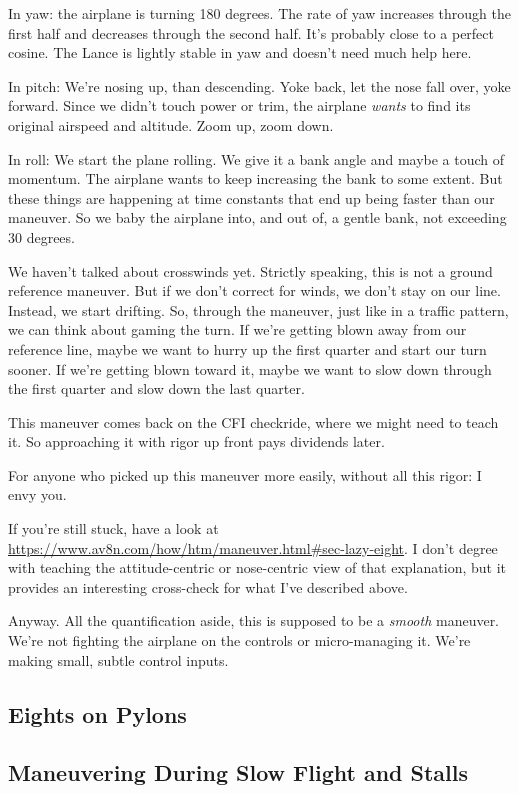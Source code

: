 In yaw: the airplane is turning 180 degrees. The rate of yaw increases through the first half and decreases through the second half. It's probably close to a perfect cosine. The Lance is lightly stable in yaw and doesn't need much help here.

In pitch: We're nosing up, than descending. Yoke back, let the nose fall over, yoke forward. Since we didn't touch power or trim, the airplane \emph{wants} to find its original airspeed and altitude. Zoom up, zoom down.

In roll: We start the plane rolling. We give it a bank angle and maybe a touch of momentum. The airplane wants to keep increasing the bank to some extent. But these things are happening at time constants that end up being faster than our maneuver. So we baby the airplane into, and out of, a gentle bank, not exceeding 30 degrees.

We haven't talked about crosswinds yet. Strictly speaking, this is not a ground reference maneuver. But if we don't correct for winds, we don't stay on our line. Instead, we start drifting. So, through the maneuver, just like in a traffic pattern, we can think about gaming the turn. If we're getting blown away from our reference line, maybe we want to hurry up the first quarter and start our turn sooner. If we're getting blown toward it, maybe we want to slow down through the first quarter and slow down the last quarter.

This maneuver comes back on the CFI checkride, where we might need to teach it. So approaching it with rigor up front pays dividends later.

For anyone who picked up this maneuver more easily, without all this rigor: I envy you.

If you're still stuck, have a look at \url{https://www.av8n.com/how/htm/maneuver.html#sec-lazy-eight}. I don't degree with teaching the attitude-centric or nose-centric view of that explanation, but it provides an interesting cross-check for what I've described above.

Anyway. All the quantification aside, this is supposed to be a \emph{smooth} maneuver. We're not fighting the airplane on the controls or micro-managing it. We're making small, subtle control inputs.

\subsection{Eights on Pylons}

\subsection{Maneuvering During Slow Flight and Stalls}

